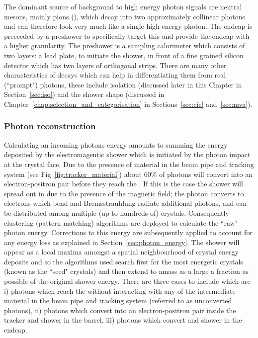 The dominant source of background to high energy photon signals are neutral mesons, mainly pions (\pizero), which decay into two approximately collinear photons and can therefore look very much like a single high energy photon. The \ECAL endcap is preceeded by a preshower to specifically target this and provide the endcap with a higher granularity. The preshower is a sampling calorimeter which consists of two layers: a lead plate, to initiate the shower, in front of a fine grained silicon detector which has two layers of orthogonal strips. There are many other characteristics of \pizero decays which can help in differentiating them from real (``prompt") photons, these include isolation (discussed later in this Chapter in Section~\ref{sec:iso}) and the shower shape (discussed in Chapter~\ref{chap:selection_and_categorisation} in Sections~\ref{sec:cic} and~\ref{sec:mva}).

\subsubsection{Photon reconstruction}

Calculating an incoming photons energy amounts to summing the energy deposited by the electromagentic shower which is initiated by the photon impact at the crystal face. Due to the presence of material in the beam pipe and tracking system (see Fig~\ref{fig:tracker_material}) about 60\% of photons will convert into an electron-positron pair before they reach the \ECAL. If this is the case the shower will spread out in \phi due to the presence of the magnetic field; the photon converts to electrons which bend and Bremsstrauhlung radiate additional photons, and can be distributed among multiple (up to hundreds of) crystals. Consequently clustering (pattern matching) algorithms are deployed to calculate the ``raw" photon energy. Corrections to this energy are subsequently applied to account for any energy loss as explained in Section~\ref{sec:photon_energy}. The shower will appear as a local maxima amongst a spatial neighbourhood of crystal energy deposits and so the algorithms used search first for the most energetic crystals (known as the ``seed" crystals) and then extend to amass as a large a fraction as possible of the original shower energy. There are three cases to include which are i) photons which reach the \ECAL without interacting with any of the intermediate material in the beam pipe and tracking system (referred to as unconverted photons), ii) photons which convert into an electron-positron pair inside the tracker and shower in the barrel, iii) photons which convert and shower in the endcap.

